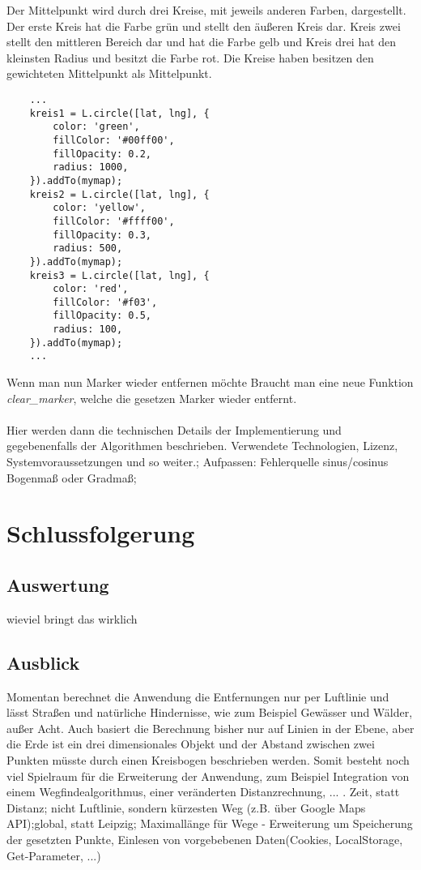 \documentclass[a4paper, twoside, 12pt]{scrreprt}
\begin{document}
Der Mittelpunkt wird durch drei Kreise, mit jeweils anderen Farben, dargestellt.
Der erste Kreis hat die Farbe grün und stellt den äußeren Kreis dar.
Kreis zwei stellt den mittleren Bereich dar und hat die Farbe gelb und Kreis drei hat den kleinsten Radius und besitzt die Farbe rot.
Die Kreise haben besitzen den gewichteten Mittelpunkt als Mittelpunkt.
\begin{lstlisting}
	...
	kreis1 = L.circle([lat, lng], {
		color: 'green',
		fillColor: '#00ff00',
		fillOpacity: 0.2,
		radius: 1000,
	}).addTo(mymap);
	kreis2 = L.circle([lat, lng], {
		color: 'yellow',
		fillColor: '#ffff00',
		fillOpacity: 0.3,
		radius: 500,
	}).addTo(mymap);
	kreis3 = L.circle([lat, lng], {
		color: 'red',
		fillColor: '#f03',
		fillOpacity: 0.5,
		radius: 100,
	}).addTo(mymap);
	...
\end{lstlisting}
Wenn man nun Marker wieder entfernen möchte Braucht man eine neue Funktion \textit{clear\_marker}, welche die gesetzen Marker wieder entfernt.
\\\\Hier werden dann die technischen
 Details der Implementierung und gegebenenfalls der Algorithmen beschrieben.
Verwendete Technologien, Lizenz, Systemvoraussetzungen und so weiter.;
Aufpassen: Fehlerquelle sinus/cosinus Bogenmaß oder Gradmaß;
\chapter{Schlussfolgerung}
\section{Auswertung}
wieviel bringt das wirklich
\section{Ausblick}
Momentan berechnet die Anwendung die Entfernungen nur per Luftlinie und lässt Straßen und natürliche Hindernisse, wie zum Beispiel Gewässer und Wälder, außer Acht.
Auch basiert die Berechnung bisher nur auf Linien in der Ebene, aber die Erde ist ein drei dimensionales Objekt und der Abstand zwischen zwei Punkten müsste durch einen Kreisbogen beschrieben werden.
Somit besteht noch viel Spielraum für die Erweiterung der Anwendung, zum Beispiel Integration von einem Wegfindealgorithmus, einer veränderten Distanzrechnung, ... .
Zeit, statt Distanz; nicht Luftlinie, sondern kürzesten Weg (z.B. über Google Maps API);global, statt Leipzig; Maximallänge für Wege
- Erweiterung um Speicherung der gesetzten Punkte, Einlesen von vorgebebenen Daten(Cookies, LocalStorage, Get-Parameter, ...)
\end{document}
